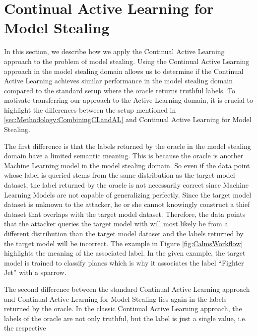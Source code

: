\section{Continual Active Learning for Model Stealing}
\label{sec:Methodolody:CALMS}
In this section, we describe how we apply the Continual Active Learning approach to the problem of model stealing. Using the Continual Active Learning approach
in the model stealing domain allows us to determine if the Continual Active Learning achieves similar performance in the model stealing domain compared to
the standard setup where the oracle returns truthful labels. To motivate transferring our approach to the Active Learning domain, it is crucial to highlight the
differences between the setup mentioned in \ref{sec:Methodology:CombiningCLandAL} and Continual Active Learning for Model Stealing. \par
The first difference is that the labels returned by the oracle in the model stealing domain have a limited semantic meaning. This is because the oracle is another
Machine Learning model in the model stealing domain. So even if the data point whose label is queried stems from the same distribution as the target model dataset,
the label returned by the oracle is not necessarily correct since Machine Learning Models are not capable of generalizing perfectly. Since the target model dataset
is unknown to the attacker, he or she cannot knowingly construct a thief dataset that overlaps with the target model dataset. Therefore, the data points that the
attacker queries the target model with will most likely be from a different distribution than the target model dataset and the labels returned by the target model
will be incorrect. The example in Figure \ref{fig:CalmsWorkflow} highlights the meaning of the associated label. In the given example, the target model is trained
to classify planes which is why it associates the label \enquote{Fighter Jet} with a sparrow. \par
The second difference between the standard Continual Active Learning approach and Continual Active Learning for Model Stealing lies again in the labels returned by
the oracle. In the classic Continual Active Learning approach, the labels of the oracle are not only truthful, but the label is just a single value, i.e. the respective
